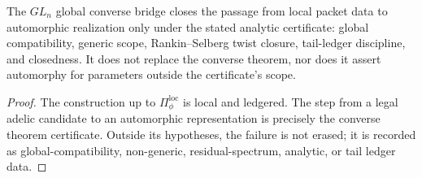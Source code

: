 \begin{theorem}
\label{thm:unified-reality-gln-converse-bridge-boundary}
The $GL_n$ global converse bridge closes the passage from local packet
data to automorphic realization only under the stated analytic
certificate: global compatibility, generic scope, Rankin--Selberg
twist closure, tail-ledger discipline, and closedness. It does not
replace the converse theorem, nor does it assert automorphy for
parameters outside the certificate's scope.
\end{theorem}
\begin{proof}
The construction up to $\Pi_{\phi}^{\mathrm{loc}}$ is local and
ledgered. The step from a legal adelic candidate to an automorphic
representation is precisely the converse theorem certificate. Outside
its hypotheses, the failure is not erased; it is recorded as
global-compatibility, non-generic, residual-spectrum, analytic, or tail
ledger data.
\end{proof}

